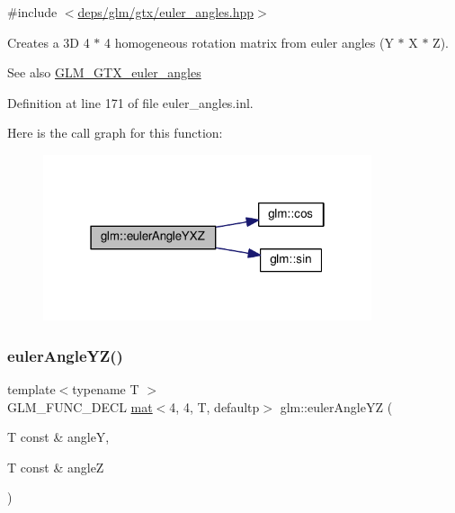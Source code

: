 {\ttfamily \#include $<$\hyperlink{euler__angles_8hpp}{deps/glm/gtx/euler\+\_\+angles.\+hpp}$>$}

Creates a 3D 4 $\ast$ 4 homogeneous rotation matrix from euler angles (Y $\ast$ X $\ast$ Z). \begin{DoxySeeAlso}{See also}
\hyperlink{group__gtx__euler__angles}{G\+L\+M\+\_\+\+G\+T\+X\+\_\+euler\+\_\+angles} 
\end{DoxySeeAlso}


Definition at line 171 of file euler\+\_\+angles.\+inl.

Here is the call graph for this function\+:
\nopagebreak
\begin{figure}[H]
\begin{center}
\leavevmode
\includegraphics[width=274pt]{d2/d7e/group__gtx__euler__angles_gab8ba99a9814f6d9edf417b6c6d5b0c10_cgraph}
\end{center}
\end{figure}
\mbox{\label{group__gtx__euler__angles_ga220379e10ac8cca55e275f0c9018fed9}} 
\subsubsection{\texorpdfstring{euler\+Angle\+Y\+Z()}{eulerAngleYZ()}}
{\footnotesize\ttfamily template$<$typename T $>$ \\
G\+L\+M\+\_\+\+F\+U\+N\+C\+\_\+\+D\+E\+CL \hyperlink{structglm_1_1mat}{mat}$<$4, 4, T, defaultp$>$ glm\+::euler\+Angle\+YZ (\begin{DoxyParamCaption}\item[{T const \&}]{angleY,  }\item[{T const \&}]{angleZ }\end{DoxyParamCaption})}



